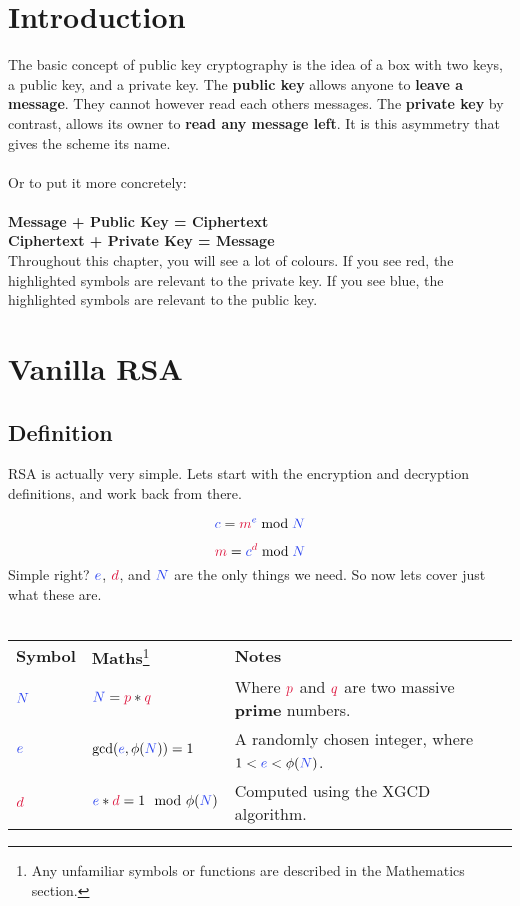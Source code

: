 
\section{Introduction}

	The basic concept of public key cryptography is the idea of a box with two keys, a public key, and a private key. The \textbf{public key} allows anyone to \textbf{leave a message}. They cannot however read each others messages. The \textbf{private key} by contrast, allows its owner to \textbf{read any message left}. It is this asymmetry that gives the scheme its name.\\
	\\
	Or to put	it more concretely:\\
	\\
	\textbf{Message + \textcolor{B}{Public Key} = Ciphertext}\\
	\textbf{Ciphertext + \textcolor{R}{Private Key} = Message}\\

	Throughout this chapter, you will see a lot of colours. If you see \textcolor{R}{red}, the highlighted symbols are relevant to the \textcolor{R}{private key}. If you see \textcolor{B}{blue}, the highlighted symbols are relevant to the \textcolor{B}{public key}.

\section{Vanilla RSA}

	\subsection{Definition}

		RSA is actually very simple. Lets start with the encryption and decryption definitions, and work back from there.

		$$ \cc = \cm^{\ce} \bmod \cN $$

		$$ \cm = \cc^{\cd} \bmod \cN $$
		Simple right? $\ce$, $\cd$, and $\cN$ are the only things we need. So now lets cover just what these are.\\
		\\
	  \begin{tabularx}{\linewidth}{l l X}
		  \textbf{Symbol} & \textbf{Maths}\footnote{Any unfamiliar symbols or functions are described in the Mathematics section.} & \textbf{Notes}\\
		  $\textcolor{B}{N}$ & $\cN = \cp * \cq$ & Where $\cp$ and $\cq$ are two massive \textbf{prime} numbers.
		  \\
		  $\ce$ & $\gcd(\ce,\phi(\cN))=1$ & A randomly chosen integer, where $1 < \ce < \phi(\cN)$.
		  \\
		  $\cd$ & $\ce*\cd = 1 \mod \phi(\cN)$ & Computed using the XGCD algorithm.
		  \\
	  \end{tabularx}
	  
